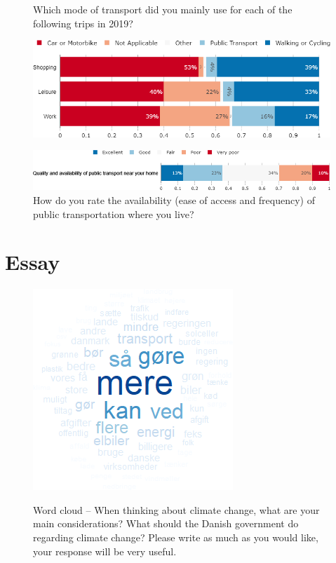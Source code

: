\documentclass[aspectratio=169,9pt,dvipsnames]{beamer}
\begin{document}
\begin{frame}{}%
\begin{figure}[h!]
\centering
\caption{Which mode of transport did you mainly use for each of the following trips in 2019?}
\includegraphics[width=.7\textwidth]{../figures/DK/transport_DK.png} \\
\vspace{.5cm}
\caption{How do you rate the availability (ease of access and frequency) of public transportation where you live?}
\includegraphics[width=.9\textwidth]{../figures/DK/availability_transport_DK.png}
\end{figure}
\end{frame}

\section{Essay}


\begin{frame}{}%
\begin{figure}[h!]
\centering
\caption{Word cloud -- When thinking about climate change, what are your main considerations? What should the Danish government do regarding climate change?
Please write as much as you would like, your response will be very useful.}
\includegraphics[width=.5\textwidth]{../figures/DK/CC_field_DK.png} \\
\end{figure}
\end{frame}
\end{document}
